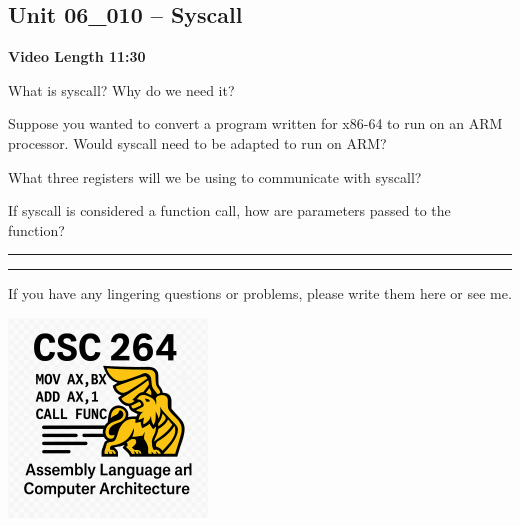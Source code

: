 \documentclass[letterpaper,12pt]{exam}
\newcommand{\unit}{Unit 06}
\begin{document}
\begin{questions}
\section*{\unit\_010 -- Syscall}
\par{\selectfont\textbf{Video Length 11:30}}
\begin{samepage}
    \question What is syscall?  Why do we need it?
    \vspace{5mm}
\end{samepage}
\par
\begin{samepage}
    \question Suppose you wanted to convert a program written for x86-64 to run on an ARM processor.  Would syscall need to be adapted to run on ARM?
    \vspace{5mm}
\end{samepage}
\par
 \begin{samepage}
     \question What three registers will we be using to communicate with syscall?
     \vspace{5mm}
 \end{samepage}
 \par
 \begin{samepage}
     \question If syscall is considered a function call, how are parameters passed to the function?
     \vspace{5mm}
 \end{samepage}
 \par
   
\rule{0.5\textwidth}{.4pt} %



\end{questions} 
\begin{center}
    \rule{0.667\textwidth}{.8pt} %
\end{center}


If you have any lingering questions or problems, please write them here or see me.
\vfill
\begin{center}
\includegraphics{../csc264Logo}
\end{center}
\end{document}
